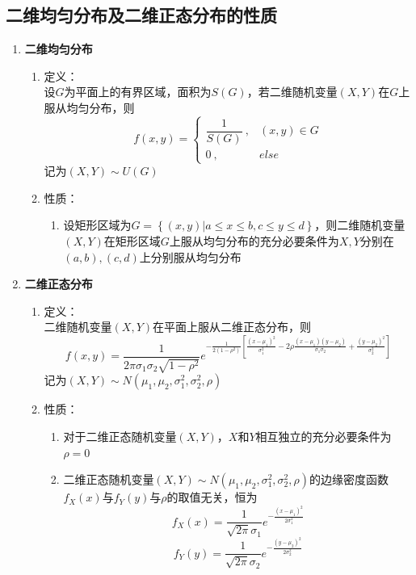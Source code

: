 \documentclass[12pt,a4paper,UTF8]{book}
\begin{document}
\subsection{二维均匀分布及二维正态分布的性质}
\begin{enumerate}
\item \textbf{二维均匀分布}
\begin{enumerate}
\item 定义：\\
设$G$为平面上的有界区域，面积为$S\left(G\right)$，若二维随机变量$\left(X,Y\right)$在$G$上服从均匀分布，则
\[f\left(x,y\right)=\left\{\begin{matrix}
\dfrac{1}{S\left(G\right)}\ ,&\left(x,y\right)\in G\\
0\ ,&else
\end{matrix}\right.\]
记为$\left(X,Y\right)\sim U\left(G\right)$
\item 性质：
\begin{enumerate}
\item 设矩形区域为$G=\left\{\left(x,y\right)|a\leq x\leq b,c\leq y\leq d\right\}$，则二维随机变量$\left(X,Y\right)$在矩形区域$G$上服从均匀分布的充分必要条件为$X,Y$分别在$\left(a,b\right),\left(c,d\right)$上分别服从均匀分布
\end{enumerate}
\end{enumerate}
\item \textbf{二维正态分布}
\begin{enumerate}
\item 定义：\\
二维随机变量$\left(X,Y\right)$在平面上服从二维正态分布，则
\[f\left(x,y\right)=\frac{1}{2\pi\sigma_1\sigma_2\sqrt{1-\rho^2}}e^{-\frac{1}{2\left(1-\rho^2\right)}\left[\frac{\left(x-\mu_1\right)^2}{\sigma_1^2}-2\rho\frac{\left(x-\mu_1\right)\left(y-\mu_2\right)}{\sigma_1\sigma_2}+\frac{\left(y-\mu_2\right)^2}{\sigma_2^2}\right]}\]
记为$\left(X,Y\right)\sim N\left(\mu_1,\mu_2,\sigma_1^2,\sigma_2^2,\rho\right)$
\item 性质：
\begin{enumerate}
\item 对于二维正态随机变量$\left(X,Y\right)$，$X$和$Y$相互独立的充分必要条件为$\rho=0$
\item 二维正态随机变量$\left(X,Y\right)\sim N\left(\mu_1,\mu_2,\sigma_1^2,\sigma_2^2,\rho\right)$的边缘密度函数$f_X\left(x\right)$与$f_Y\left(y\right)$与$\rho$的取值无关，恒为
\[f_X\left(x\right)=\frac{1}{\sqrt{2\pi}\sigma_1}e^{-\frac{\left(x-\mu_1\right)^2}{2\sigma_1^2}}\]
\[f_Y\left(y\right)=\frac{1}{\sqrt{2\pi}\sigma_2}e^{-\frac{\left(y-\mu_2\right)^2}{2\sigma_2^2}}\]

\end{enumerate}
\end{enumerate}
\end{enumerate}
\end{document}
